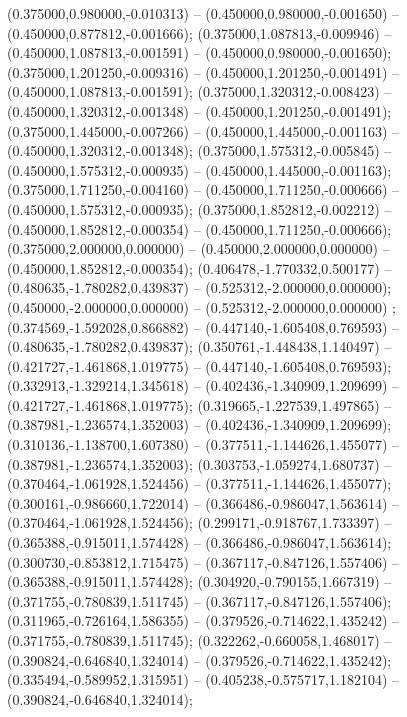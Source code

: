  (0.375000,0.980000,-0.010313) -- (0.450000,0.980000,-0.001650) -- (0.450000,0.877812,-0.001666);
 (0.375000,1.087813,-0.009946) -- (0.450000,1.087813,-0.001591) -- (0.450000,0.980000,-0.001650);
 (0.375000,1.201250,-0.009316) -- (0.450000,1.201250,-0.001491) -- (0.450000,1.087813,-0.001591);
 (0.375000,1.320312,-0.008423) -- (0.450000,1.320312,-0.001348) -- (0.450000,1.201250,-0.001491);
 (0.375000,1.445000,-0.007266) -- (0.450000,1.445000,-0.001163) -- (0.450000,1.320312,-0.001348);
 (0.375000,1.575312,-0.005845) -- (0.450000,1.575312,-0.000935) -- (0.450000,1.445000,-0.001163);
 (0.375000,1.711250,-0.004160) -- (0.450000,1.711250,-0.000666) -- (0.450000,1.575312,-0.000935);
 (0.375000,1.852812,-0.002212) -- (0.450000,1.852812,-0.000354) -- (0.450000,1.711250,-0.000666);
 (0.375000,2.000000,0.000000) -- (0.450000,2.000000,0.000000) -- (0.450000,1.852812,-0.000354);
 (0.406478,-1.770332,0.500177) -- (0.480635,-1.780282,0.439837) -- (0.525312,-2.000000,0.000000);
 (0.450000,-2.000000,0.000000) -- (0.525312,-2.000000,0.000000) ;
 (0.374569,-1.592028,0.866882) -- (0.447140,-1.605408,0.769593) -- (0.480635,-1.780282,0.439837);
 (0.350761,-1.448438,1.140497) -- (0.421727,-1.461868,1.019775) -- (0.447140,-1.605408,0.769593);
 (0.332913,-1.329214,1.345618) -- (0.402436,-1.340909,1.209699) -- (0.421727,-1.461868,1.019775);
 (0.319665,-1.227539,1.497865) -- (0.387981,-1.236574,1.352003) -- (0.402436,-1.340909,1.209699);
 (0.310136,-1.138700,1.607380) -- (0.377511,-1.144626,1.455077) -- (0.387981,-1.236574,1.352003);
 (0.303753,-1.059274,1.680737) -- (0.370464,-1.061928,1.524456) -- (0.377511,-1.144626,1.455077);
 (0.300161,-0.986660,1.722014) -- (0.366486,-0.986047,1.563614) -- (0.370464,-1.061928,1.524456);
 (0.299171,-0.918767,1.733397) -- (0.365388,-0.915011,1.574428) -- (0.366486,-0.986047,1.563614);
 (0.300730,-0.853812,1.715475) -- (0.367117,-0.847126,1.557406) -- (0.365388,-0.915011,1.574428);
 (0.304920,-0.790155,1.667319) -- (0.371755,-0.780839,1.511745) -- (0.367117,-0.847126,1.557406);
 (0.311965,-0.726164,1.586355) -- (0.379526,-0.714622,1.435242) -- (0.371755,-0.780839,1.511745);
 (0.322262,-0.660058,1.468017) -- (0.390824,-0.646840,1.324014) -- (0.379526,-0.714622,1.435242);
 (0.335494,-0.589952,1.315951) -- (0.405238,-0.575717,1.182104) -- (0.390824,-0.646840,1.324014);
